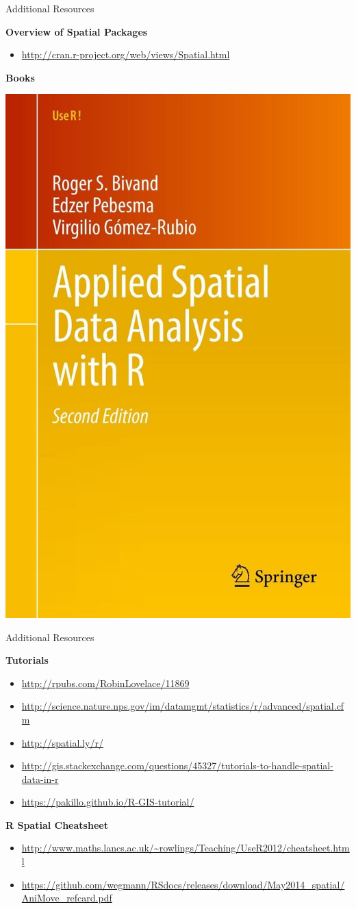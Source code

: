 \documentclass[10pt,ignorenonframetext,]{beamer}
\providecommand{\tightlist}{%
  \setlength{\itemsep}{0pt}\setlength{\parskip}{0pt}}
\begin{document}
\begin{frame}{Additional Resources}

\textbf{Overview of Spatial Packages}

\begin{itemize}
\tightlist
\item
  \url{http://cran.r-project.org/web/views/Spatial.html}
\end{itemize}

\textbf{Books}

\begin{center}\includegraphics[width=0.3\linewidth]{../images/applied_spatial_data_analysis} \end{center}

\end{frame}

\begin{frame}{Additional Resources}

\textbf{Tutorials}

\begin{itemize}
\tightlist
\item
  \url{http://rpubs.com/RobinLovelace/11869}
\item
  \url{http://science.nature.nps.gov/im/datamgmt/statistics/r/advanced/spatial.cfm}
\item
  \url{http://spatial.ly/r/}
\item
  \url{http://gis.stackexchange.com/questions/45327/tutorials-to-handle-spatial-data-in-r}
\item
  \url{https://pakillo.github.io/R-GIS-tutorial/}
\end{itemize}

\textbf{R Spatial Cheatsheet}

\begin{itemize}
\tightlist
\item
  \url{http://www.maths.lancs.ac.uk/~rowlings/Teaching/UseR2012/cheatsheet.html}
\item
  \url{https://github.com/wegmann/RSdocs/releases/download/May2014_spatial/AniMove_refcard.pdf}
\end{itemize}

\end{frame}
\end{document}
